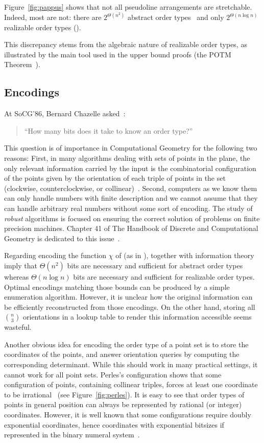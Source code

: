 Figure~\ref{fig:pappus} shows that not all pseudoline arrangements are
stretchable. Indeed, most are not: there are \(2^{\Theta(n^2)}\)
abstract order types~\cite{Fe96} and only \(2^{\Theta(n \log n)}\) realizable
order types ().
%

%
This discrepancy stems from the algebraic nature of realizable order types, as
illustrated by the main tool used in the upper bound proofs (the
POTM Theorem~\cite{Mi64,Th65,BPR06}).

\subsection{Encodings}%
\label{sec:problem:pol:encodings}

At SoCG'86, Bernard Chazelle asked~\cite{GP93}:
\begin{quotation}
``How many bits does it take to know an order type?''
\end{quotation}

This question is of importance in Computational Geometry for the following two
reasons:
%
First, in many algorithms dealing with sets of points in the plane,
the only relevant information carried by the input is the combinatorial
configuration of the points given by the orientation of each triple of points in the
set (clockwise, counterclockwise, or collinear)~\cite{Knu92,Ed12,Epp18}.
%
Second, computers as we know them can only handle numbers with
finite description and we cannot assume that they can handle arbitrary
real numbers without some sort of encoding. The study of \emph{robust}
algorithms is focused on ensuring the correct solution of problems on finite
precision machines. Chapter 41 of The Handbook of Discrete and Computational
Geometry is dedicated to this issue~\cite{Ya04}.


Regarding encoding the function \(\chi\) of 
(as in ),
 together with information theory
imply that \(\Theta(n^2)\) bits are necessary
and sufficient for abstract order types whereas \(\Theta(n \log n)\) bits are
necessary and sufficient for realizable order types.
Optimal encodings matching those bounds can be produced
by a simple enumeration algorithm.
%
However, it is unclear how the original information can be
efficiently reconstructed from those encodings.
%
On the other hand, storing all \( \binom{n}{3} \) orientations in a lookup
table to render this information accessible seems wasteful.

Another obvious idea for encoding the order type of a point set is to store
the coordinates of the points, and answer orientation queries
by computing the corresponding determinant. While this should work in many practical
settings, it cannot work for all point sets. Perles's configuration shows that
some configuration of points, containing collinear triples, forces at least one
coordinate to be irrational~\cite{Gr05} (see Figure~\ref{fig:perles}).
%
It is easy to see that
order types of points in general position can always be represented by rational
(or integer) coordinates.
%
However, it is well known that some configurations require doubly
exponential coordinates, hence coordinates with exponential bitsizes if
represented in the binary numeral system~\cite{GPS89}.

